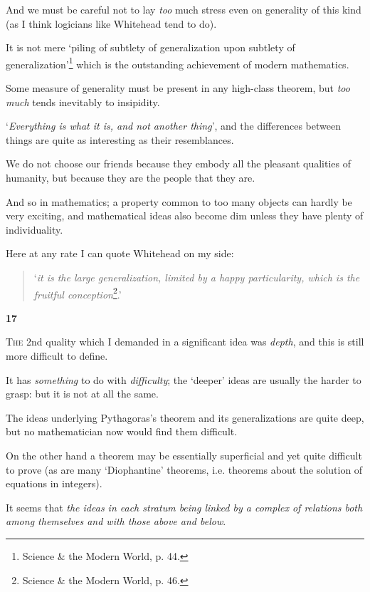 \documentclass{article}
\numberwithin{equation}{section}
\begin{document}
And we must be careful not to lay \textit{too} much stress even on generality of this kind (as I think logicians like Whitehead tend to do).

It is not mere `piling of subtlety of generalization upon subtlety of generalization'\footnote{Science \& the Modern World, p. 44.} which is the outstanding achievement of modern mathematics.

Some measure of generality must be present in any high-class theorem, but \textit{too much} tends inevitably to insipidity.

`\textit{Everything is what it is, and not another thing}', and the differences between things are quite as interesting as their resemblances.

We do not choose our friends because they embody all the pleasant qualities of humanity, but because they are the people that they are.

And so in mathematics; a property common to too many objects can hardly be very exciting, and mathematical ideas also become dim unless they have plenty of individuality.

Here at any rate I can quote Whitehead on my side:
\begin{quotation}
    `\textit{it is the large generalization, limited by a happy particularity, which is the fruitful conception}\footnote{Science \& the Modern World, p. 46.}.'
\end{quotation}

\begin{center}
    \large\textbf{17}
\end{center}
\textsc{The} 2nd quality which I demanded in a significant idea was \textit{depth}, and this is still more difficult to define.

It has \textit{something} to do with \textit{difficulty}; the `deeper' ideas are usually the harder to grasp: but it is not at all the same.

The ideas underlying Pythagoras's theorem and its generalizations are quite deep, but no mathematician now would find them difficult.

On the other hand a theorem may be essentially superficial and yet quite difficult to prove (as are many `Diophantine' theorems, i.e. theorems about the solution of equations in integers).

%
It seems that \textit{ the ideas in each stratum being linked by a complex of relations both among themselves and with those above and below}.
\end{document}
